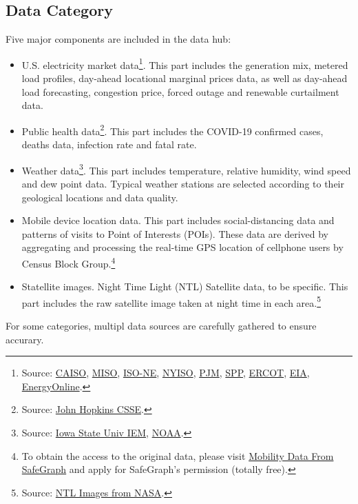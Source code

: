 \documentclass[10pt]{article}
\numberwithin{equation}{section}
\numberwithin{table}{section}
\numberwithin{figure}{section}
\begin{document}
\subsection{Data Category}
Five major components are included in the data hub: 
\begin{itemize}
	\item U.S. electricity market data\footnote{Source: \href{http://oasis.caiso.com/mrioasis/logon.do}{CAISO}, \href{https://www.misoenergy.org/markets-and-operations/real-time--market-data/market-reports/}{MISO}, \href{https://www.iso-ne.com/markets-operations/iso-express}{ISO-NE}, \href{https://www.nyiso.com/energy-market-operational-data}{NYISO}, \href{https://dataminer2.pjm.com/list}{PJM}, \href{https://marketplace.spp.org/groups/operational_data}{SPP}, \href{http://www.ercot.com/}{ERCOT}, \href{https://www.eia.gov/beta/electricity/gridmonitor/dashboard/electric_overview/US48/US48}{EIA}, \href{http://www.energyonline.com/}{EnergyOnline}.}. This part includes the generation mix, metered load profiles, day-ahead locational marginal prices data, as well as day-ahead load forecasting, congestion price, forced outage and renewable curtailment data.
	\item Public health data\footnote{Source: \href{https://github.com/CSSEGISandData/COVID-19}{John Hopkins CSSE}.}. This part includes the COVID-19 confirmed cases, deaths data, infection rate and fatal rate.
	\item Weather data\footnote{Source: \href{https://mesonet.agron.iastate.edu/request/download.phtml}{Iowa State Univ IEM}, \href{https://www.nws.noaa.gov/ost/asostech.html}{NOAA}.}. This part includes temperature, relative humidity, wind speed and dew point data. Typical weather stations are selected according to their geological locations and data quality.
	\item Mobile device location data. This part includes social-distancing data and patterns of visits to Point of Interests (POIs). These data are derived by aggregating and processing the real-time GPS location of cellphone users by Census Block Group.\footnote{To obtain the access to the original data, please visit \href{https://docs.safegraph.com/docs}{Mobility Data From SafeGraph} and apply for SafeGraph's permission (totally free).}
	\item Statellite images. Night Time Light (NTL)	Satellite data, to be specific. This part includes the raw satellite image taken at night time in each area.\footnote{Source: \href{https://ladsweb.modaps.eosdis.nasa.gov/missions-and-measurements/products/VNP46A1/}{NTL Images from NASA}.}
\end{itemize}
For some categories, multipl data sources are carefully gathered to ensure accurary.
\end{document}
